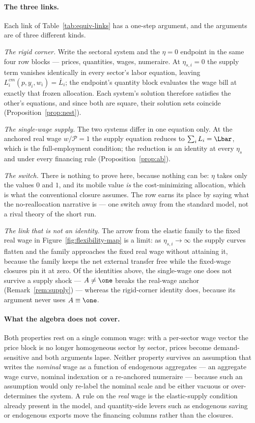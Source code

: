 \paragraph{The three links.} Each link of Table~\ref{tab:equiv-links} has a
one-step argument, and the arguments are of three different kinds.

\emph{The rigid corner.} Write the sectoral system and the $\eta=0$ endpoint in
the same four row blocks --- prices, quantities, wages, numeraire. At
$\eta_{s,i}=0$ the supply term vanishes identically in every sector's labor
equation, leaving $L^{cm}_i(p,y_i,w_i)=\bar L_i$; the endpoint's quantity block
evaluates the wage bill at exactly that frozen allocation. Each system's
solution therefore satisfies the other's equations, and since both are square,
their solution sets coincide (Proposition~\ref{prop:nest}).

\emph{The single-wage supply.} The two systems differ in one equation only. At
the anchored real wage $w/\mathcal{P} = 1$ the supply equation reduces to
$\sum_i L_i = \Lbar$, which is the full-employment condition; the reduction is
an identity at every $\eta_s$ and under every financing rule
(Proposition~\ref{prop:ab}).

\emph{The switch.} There is nothing to prove here, because nothing can be:
$\eta$ takes only the values $0$ and $1$, and its mobile value \emph{is} the
cost-minimizing allocation, which is what the conventional closure assumes. The
row earns its place by saying what the no-reallocation narrative is --- one
switch away from the standard model, not a rival theory of the short run.

\emph{The link that is not an identity.} The arrow from the elastic family to
the fixed real wage in Figure~\ref{fig:flexibility-map} is a limit: as
$\eta_{s,i}\to\infty$ the supply curves flatten and the family approaches the
fixed real wage without attaining it, because the family keeps the net external
transfer free while the fixed-wage closures pin it at zero. Of the identities
above, the single-wage one does not survive a supply shock --- $A\neq\one$
breaks the real-wage anchor (Remark~\ref{rem:supply}) --- whereas the
rigid-corner identity does, because its argument never uses $A\equiv\one$.

\paragraph{What the algebra does not cover.} Both properties rest on a single
common wage: with a per-sector wage vector the price block is no longer
homogeneous sector by sector, prices become demand-sensitive and both
arguments lapse. Neither property survives an assumption that writes the
\emph{nominal} wage as a function of endogenous aggregates --- an aggregate
wage curve, nominal indexation or a re-anchored numeraire --- because such an assumption would only re-label the nominal scale and be either
vacuous or over-determines the system. A rule on the \emph{real} wage is the
elastic-supply condition already present in the model, and quantity-side
levers such as endogenous saving or endogenous exports move the financing
columns rather than the closures.


